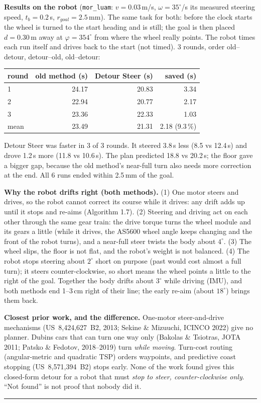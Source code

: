 \documentclass[11pt,a4paper]{article}
\begin{document}
{\medskip
\noindent\textbf{Results on the robot} (\texttt{mor\_luam}: $v = 0.03$\,m/s, $\omega = 35^\circ$/s its measured
steering speed, $t_b = 0.2$\,s, $r_{goal} = 2.5$\,mm). The same task for both: before the clock starts the
wheel is turned to the start heading and is still; the goal is then placed $d = 0.30$\,m away at
$\varphi = 354^\circ$ from where the wheel really points. The robot times each run itself and drives back to
the start (not timed). 3 rounds, order old--detour, detour--old, old--detour:
\begin{center}
\begin{tabular}{lrrr}
\toprule
round & old method (s) & Detour Steer (s) & saved (s) \\
\midrule
1 & 24.17 & 20.83 & 3.34 \\
2 & 22.94 & 20.77 & 2.17 \\
3 & 23.36 & 22.33 & 1.03 \\
\midrule
mean & 23.49 & 21.31 & 2.18 (9.3\,\%) \\
\bottomrule
\end{tabular}
\end{center}
\noindent Detour Steer was faster in 3 of 3 rounds. It steered 3.8\,s less (8.5 vs 12.4\,s) and drove 1.2\,s
more (11.8 vs 10.6\,s). The plan predicted 18.8 vs 20.2\,s; the floor gave a bigger gap, because the old
method's near-full turn also needs more correction at the end. All 6 runs ended within 2.5\,mm of the goal.

\medskip
\noindent\textbf{Why the robot drifts right (both methods).}
(1) One motor steers and drives, so the robot cannot correct its course while it drives: any drift adds up
until it stops and re-aims (Algorithm 1.7).
(2) Steering and driving act on each other through the same gear train: the drive torque turns the wheel
module and its gears a little (while it drives, the AS5600 wheel angle keeps changing and the
front of the robot turns), and a near-full steer twists the body about $4^\circ$.
(3) The wheel slips, the floor is not flat, and the robot's weight is not balanced.
(4) The robot stops steering about $2^\circ$ short on purpose (past would cost almost a full turn); it steers
counter-clockwise, so short means the wheel points a little to the right of the goal.
Together the body drifts about $3^\circ$ while driving (IMU), and both methods end 1--3\,cm right of their
line; the early re-aim (about $18^\circ$) brings them back.

\medskip
\noindent\textbf{Closest prior work, and the difference.}
One-motor steer-and-drive mechanisms (US~8,424,627~B2, 2013; Sekine \& Mizuuchi, ICINCO 2022) give no
planner. Dubins cars that can turn one way only (Bakolas \& Tsiotras, JOTA 2011; Patsko \& Fedotov,
2018--2019) turn \emph{while moving}. Turn-cost routing (angular-metric and quadratic TSP) orders
waypoints, and predictive coast stopping (US~8,571,394~B2) stops early. None of the work found gives this
closed-form detour for a robot that must \emph{stop to steer, counter-clockwise only}. ``Not found'' is not proof
that nobody did it.
}
\par\vspace{1mm}
\noindent\rule{\linewidth}{1.1pt}\par
\end{document}
